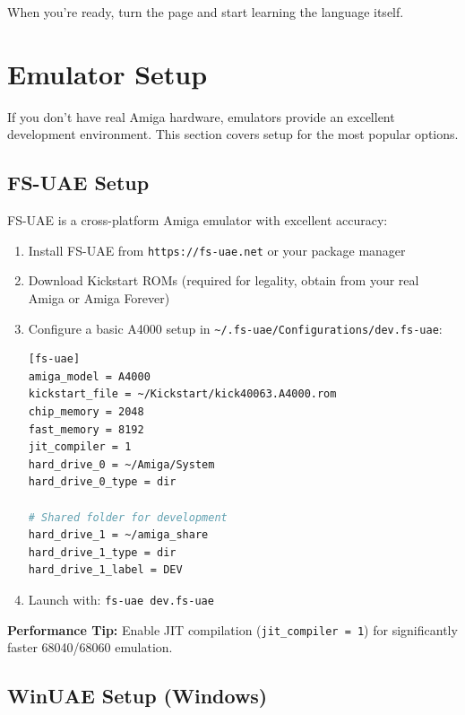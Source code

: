 When you're ready, turn the page and start learning the language itself.

\section{Emulator Setup}
\label{sec:emulator-setup}

If you don't have real Amiga hardware, emulators provide an excellent development environment. This section covers setup for the most popular options.

\subsection{FS-UAE Setup}

FS-UAE is a cross-platform Amiga emulator with excellent accuracy:

\begin{enumerate}
\item Install FS-UAE from \texttt{https://fs-uae.net} or your package manager

\item Download Kickstart ROMs (required for legality, obtain from your real Amiga or Amiga Forever)

\item Configure a basic A4000 setup in \texttt{\textasciitilde/.fs-uae/Configurations/dev.fs-uae}:

\begin{lstlisting}[language=bash]
[fs-uae]
amiga_model = A4000
kickstart_file = ~/Kickstart/kick40063.A4000.rom
chip_memory = 2048
fast_memory = 8192
jit_compiler = 1
hard_drive_0 = ~/Amiga/System
hard_drive_0_type = dir

# Shared folder for development
hard_drive_1 = ~/amiga_share
hard_drive_1_type = dir
hard_drive_1_label = DEV
\end{lstlisting}

\item Launch with: \texttt{fs-uae dev.fs-uae}
\end{enumerate}

\textbf{Performance Tip:} Enable JIT compilation (\texttt{jit\_compiler = 1}) for significantly faster 68040/68060 emulation.

\subsection{WinUAE Setup (Windows)}

